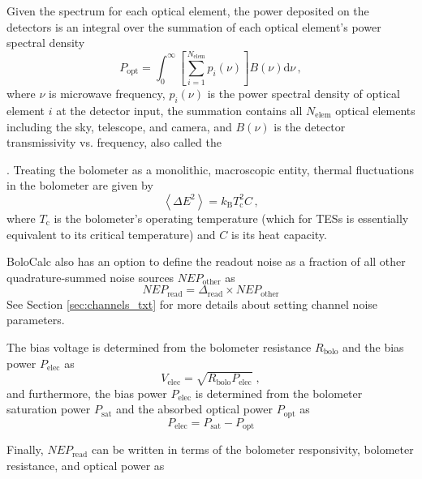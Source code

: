Given the spectrum for each optical element, the power deposited on the detectors is an integral over the summation of each optical element's power spectral density 
\begin{equation}
    P_{\mathrm{opt}} = \int_{0}^{\infty} \left[ \sum_{i=1}^{N_{\mathrm{elem}}} p_{i}(\nu) \right] B(\nu) \mathrm{d} \nu \, ,
    \label{eq:popt}
\end{equation}
where $\nu$ is microwave frequency, $p_{i}(\nu)$ is the power spectral density of optical element $i$ at the detector input, the summation contains all $N_{\mathrm{elem}}$ optical elements including the sky, telescope, and camera, and $B(\nu)$ is the detector transmissivity vs. frequency, also called the 

. Treating the bolometer as a monolithic, macroscopic entity, thermal fluctuations in the bolometer are given by 
\begin{equation}
    \left< \Delta E^{2} \right> = k_{\mathrm{B}} T_{\mathrm{c}}^{2} C \, ,
    \label{eq:bolometer_energy_fluctuations}
\end{equation}
where $T_{\mathrm{c}}$ is the bolometer's operating temperature (which for TESs is essentially equivalent to its critical temperature) and $C$ is its heat capacity. 

BoloCalc also has an option to define the readout noise as a fraction of all other quadrature-summed noise sources $NEP_{\mathrm{other}}$ as
\begin{equation}
    NEP_{\mathrm{read}} = \Delta_{\mathrm{read}} \times NEP_{\mathrm{other}}
    \label{eq:nep_read_frac}
\end{equation}
See Section \ref{sec:channels_txt} for more details about setting channel noise parameters.

The bias voltage is determined from the bolometer resistance $R_{\mathrm{bolo}}$ and the bias power $P_{\mathrm{elec}}$ as
\begin{equation}
    V_{\mathrm{elec}} = \sqrt{R_{\mathrm{bolo}} P_{\mathrm{elec}}} \; ,
    \label{eq:v_elec}
\end{equation}
and furthermore, the bias power $P_{\mathrm{elec}}$ is determined from the bolometer saturation power $P_{\mathrm{sat}}$ and the absorbed optical power $P_{\mathrm{opt}}$ as
\begin{equation}
    P_{\mathrm{elec}} = P_{\mathrm{sat}} - P_{\mathrm{opt}}
    \label{eq:p_elec}
\end{equation}

Finally, $NEP_{\mathrm{read}}$ can be written in terms of the bolometer responsivity, bolometer resistance, and optical power as

